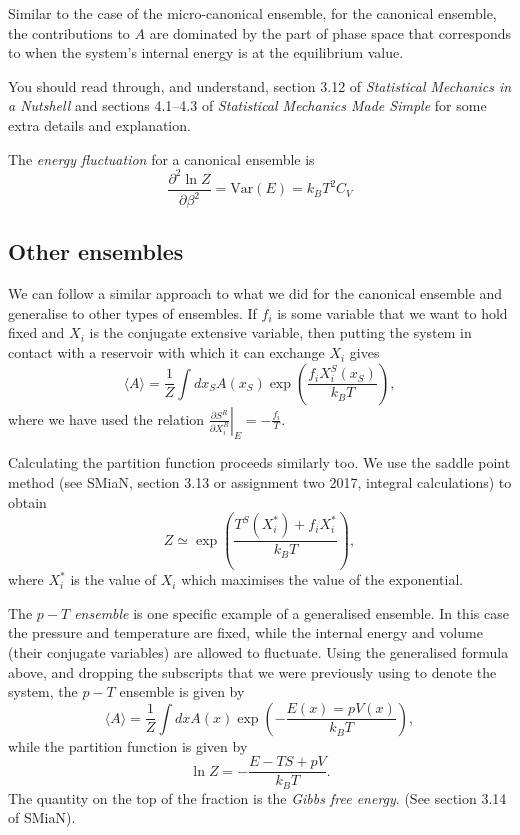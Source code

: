 \documentclass{article}
\begin{document}
Similar to the case of the micro-canonical ensemble, for the canonical ensemble, the contributions to $A$ are dominated by the part of phase space that corresponds to when the system's internal energy is at the equilibrium value. 

You should read through, and understand, section 3.12 of \emph{Statistical Mechanics in a Nutshell} and sections 4.1--4.3 of \emph{Statistical Mechanics Made Simple} for some extra details and explanation.

The {\it energy fluctuation} for a canonical ensemble is 
$$\frac{\partial ^2 \ln Z}{\partial \beta ^2} = \text{Var}(E) = k_B T^2 C_V$$

\subsection{Other ensembles}
We can follow a similar approach to what we did for the canonical ensemble and generalise to other types of ensembles. If $f_i$ is some variable that we want to hold fixed and $X_i$ is the conjugate extensive variable, then putting the system in contact with a reservoir with which it can exchange $X_i$ gives
\begin{equation*}
	\langle A\rangle = \frac{1}{Z}\int dx_SA(x_S)\exp\left(\frac{f_iX^S_i(x_S)}{k_BT}\right),
\end{equation*}
where we have used the relation $\left.\frac{\partial S^R}{\partial X_i^R}\right|_E=-\frac{f_i}{T}$.

Calculating the partition function proceeds similarly too. We use the saddle point method (see SMiaN, section 3.13 or assignment two 2017, integral calculations) to obtain
\begin{equation*}
	Z \simeq \exp\left(\frac{T^S(X_i^*)+f_iX_i^*}{k_BT}\right),
\end{equation*}
where $X_i^*$ is the value of $X_i$ which maximises the value of the exponential. 

The \emph{$p-T$ ensemble} is one specific example of a generalised ensemble. In this case the pressure and temperature are fixed, while the internal energy and volume (their conjugate variables) are allowed to fluctuate.
Using the generalised formula above, and dropping the subscripts that we were previously using to denote the system, the $p-T$ ensemble is given by
 \begin{equation*}
	\langle A\rangle = \frac{1}{Z}\int dxA(x)\exp\left(-\frac{E(x)=pV(x)}{k_BT}\right),
\end{equation*}
while the partition function is given by
$$
	\ln Z = -\frac{E-TS+pV}{k_BT}.
$$
The quantity on the top of the fraction is the \emph{Gibbs free energy}. (See section 3.14 of SMiaN).
\end{document}

